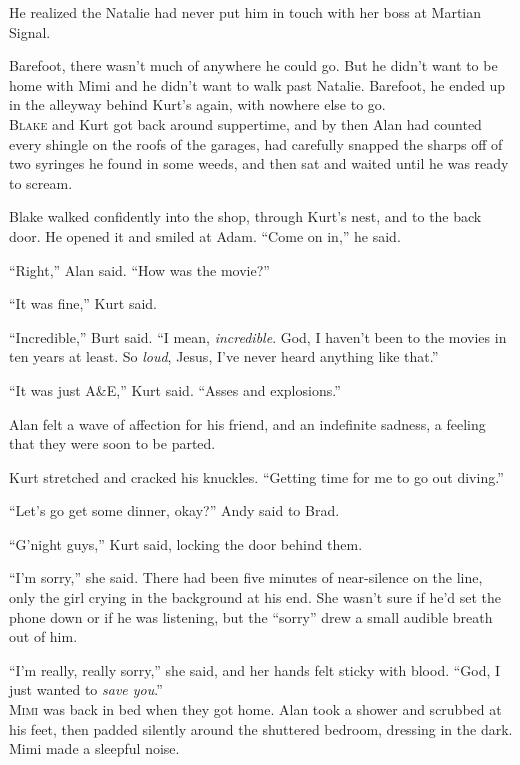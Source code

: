 He realized the Natalie had never put him in touch with her boss at
Martian Signal. 

Barefoot, there wasn't much of anywhere he could go.  But he didn't
want to be home with Mimi and he didn't want to walk past Natalie. 
Barefoot, he ended up in the alleyway behind Kurt's again, with
nowhere else to go.
\\
\lettrine[lines=3, lhang=.5, nindent=0pt, findent=2pt]{B}{lake} and Kurt got back around suppertime, and by then Alan had
counted every shingle on the roofs of the garages, had carefully
snapped the sharps off of two syringes he found in some weeds, and
then sat and waited until he was ready to scream.

Blake walked confidently into the shop, through Kurt's nest, and to
the back door.  He opened it and smiled at Adam.  ``Come on in,'' he
said.

``Right,'' Alan said.  ``How was the movie?''

``It was fine,'' Kurt said.

``Incredible,'' Burt said.  ``I mean, \textit{incredible}.  God, I
haven't been to the movies in ten years at least.  So \textit{loud},
Jesus, I've never heard anything like that.''

``It was just A\&E,'' Kurt said.  ``Asses and explosions.''

Alan felt a wave of affection for his friend, and an indefinite
sadness, a feeling that they were soon to be parted.

Kurt stretched and cracked his knuckles.  ``Getting time for me to go
out diving.''

``Let's go get some dinner, okay?'' Andy said to Brad.

``G'night guys,'' Kurt said, locking the door behind them.

``I'm sorry,'' she said.  There had been five minutes of near-silence
on the line, only the girl crying in the background at his end.  She
wasn't sure if he'd set the phone down or if he was listening, but the
``sorry'' drew a small audible breath out of him.

``I'm really, really sorry,'' she said, and her hands felt sticky with
blood.  ``God, I just wanted to \textit{save you}.''
\\
\lettrine[lines=3, lhang=.5, nindent=0pt, findent=2pt]{M}{imi} was back in bed when they got home.  Alan took a shower and
scrubbed at his feet, then padded silently around the shuttered
bedroom, dressing in the dark.  Mimi made a sleepful noise.

